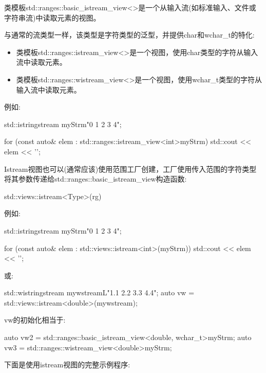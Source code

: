 类模板std::ranges::basic\_istream\_view<>是一个从输入流(如标准输入、文件或字符串流)中读取元素的视图。

与通常的流类型一样，该类型是字符类型的泛型，并提供char和wchar\_t的特化:

\begin{itemize}
\item
类模板std::ranges::istream\_view<>是一个视图，使用char类型的字符从输入流中读取元素。

\item
类模板std::ranges::wistream\_view<>是一个视图，使用wchar\_t类型的字符从输入流中读取元素。
\end{itemize}

例如:

\begin{cpp}
std::istringstream myStrm{"0 1 2 3 4"};

for (const auto& elem : std::ranges::istream_view<int>{myStrm}) {
	std::cout << elem << '\n';
}
\end{cpp}


Istream视图也可以(通常应该)使用范围工厂创建，工厂使用传入范围的字符类型将其参数传递给std::ranges::basic\_istream\_view构造函数:

\begin{cpp}
std::views::istream<Type>(rg)
\end{cpp}

例如:

\begin{cpp}
std::istringstream myStrm{"0 1 2 3 4"};

for (const auto& elem : std::views::istream<int>(myStrm)) {
	std::cout << elem << '\n';
}
\end{cpp}

或:

\begin{cpp}
std::wistringstream mywstream{L"1.1 2.2 3.3 4.4"};
auto vw = std::views::istream<double>(mywstream);
\end{cpp}

vw的初始化相当于:

\begin{cpp}
auto vw2 = std::ranges::basic_istream_view<double, wchar_t>{myStrm};
auto vw3 = std::ranges::wistream_view<double>{myStrm};
\end{cpp}

下面是使用istream视图的完整示例程序:


